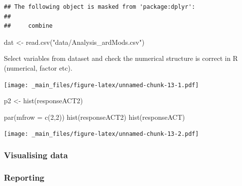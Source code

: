 \documentclass[
]{book}
\newenvironment{Shaded}{\begin{snugshade}}{\end{snugshade}}
\newcommand{\AttributeTok}[1]{\textcolor[rgb]{0.77,0.63,0.00}{#1}}
\newcommand{\CommentTok}[1]{\textcolor[rgb]{0.56,0.35,0.01}{\textit{#1}}}
\newcommand{\DecValTok}[1]{\textcolor[rgb]{0.00,0.00,0.81}{#1}}
\newcommand{\FunctionTok}[1]{\textcolor[rgb]{0.00,0.00,0.00}{#1}}
\newcommand{\NormalTok}[1]{#1}
\newcommand{\OtherTok}[1]{\textcolor[rgb]{0.56,0.35,0.01}{#1}}
\newcommand{\SpecialCharTok}[1]{\textcolor[rgb]{0.00,0.00,0.00}{#1}}
\newcommand{\StringTok}[1]{\textcolor[rgb]{0.31,0.60,0.02}{#1}}
\begin{document}
\begin{verbatim}
## The following object is masked from 'package:dplyr':
## 
##     combine
\end{verbatim}

\begin{Shaded}
\begin{Highlighting}[]
\NormalTok{dat }\OtherTok{\textless{}{-}} \FunctionTok{read.csv}\NormalTok{(}\StringTok{"data/Analysis\_ardMods.csv"}\NormalTok{)}
\end{Highlighting}
\end{Shaded}

Select variables from dataset and check the numerical structure is correct in R (numerical, factor etc).

\begin{Shaded}
\end{Shaded}

\texttt{[image: \_main\_files/figure-latex/unnamed-chunk-13-1.pdf]}

\begin{Shaded}
\begin{Highlighting}[]
\NormalTok{ p2 }\OtherTok{\textless{}{-}} \FunctionTok{hist}\NormalTok{(responseACT2)}
 
 \FunctionTok{par}\NormalTok{(}\AttributeTok{mfrow =} \FunctionTok{c}\NormalTok{(}\DecValTok{2}\NormalTok{,}\DecValTok{2}\NormalTok{))}
 \FunctionTok{hist}\NormalTok{(responseACT2)}
 \FunctionTok{hist}\NormalTok{(responseACT)}
\end{Highlighting}
\end{Shaded}

\texttt{[image: \_main\_files/figure-latex/unnamed-chunk-13-2.pdf]}

\hypertarget{visualising-data}{%
\subsubsection{Visualising data}\label{visualising-data}}

\hypertarget{reporting}{%
\subsubsection{Reporting}\label{reporting}}
\end{document}

